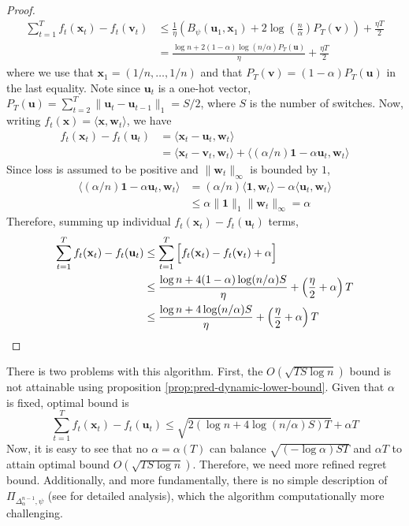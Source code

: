 \documentclass[12pt, a4paper]{report}
\begin{document}
\begin{proof}
\begin{align}
    \sum_{t=1}^T f_t(\mathbf{x}_t) - f_t(\mathbf{v}_t) &\leq  \frac{1}{\eta} \left(B_\psi(\mathbf{u}_1, \mathbf{x}_1) + 2\log\left(\frac{n}{\alpha}\right)P_T(\mathbf{v}) \right) + \frac{\eta T}{2} \nonumber
    \\
    &= \frac{\log n + 2(1-\alpha)\log(n / \alpha) P_T(\mathbf{u})}{\eta} + \frac{\eta T}{2} \nonumber
\end{align}
where we use that $\mathbf{x}_1 = (1/n, \dots, 1/n)$ and that $P_T(\mathbf{v}) = (1 - \alpha)P_T(\mathbf{u})$ in the last equality. Note since $\mathbf{u}_t$ is a one-hot vector, $P_T(\mathbf{u}) = \sum_{t=2}^T \lVert \mathbf{u}_t - \mathbf{u}_{t-1} \rVert_1 = S/2$, where $S$ is the number of switches. Now, writing $f_t(\mathbf{x}) = \langle \mathbf{x}, \mathbf{w}_t \rangle$, we have
\begin{align*}
    f_t(\mathbf{x}_t) - f_t(\mathbf{u}_t) &= \langle \mathbf{x}_t - \mathbf{u}_t, \mathbf{w}_t \rangle
    \\
    &= \langle \mathbf{x}_t - \mathbf{v}_t, \mathbf{w}_t \rangle + \langle (\alpha/n) \mathbf{1} - \alpha \mathbf{u}_t, \mathbf{w}_t \rangle
\end{align*}
Since loss is assumed to be positive and $\lVert \mathbf{w}_t \rVert_\infty$ is bounded by $1$,
\begin{align*}
    \langle (\alpha/n)\mathbf{1} - \alpha \mathbf{u}_t, \mathbf{w}_t \rangle &= (\alpha/n) \langle \mathbf{1}, \mathbf{w}_t \rangle - \alpha \langle \mathbf{u}_t, \mathbf{w}_t \rangle 
    \\
    &\leq \alpha \lVert \mathbf{1} \rVert_1 \lVert \mathbf{w}_t \rVert_\infty = \alpha
\end{align*}
Therefore, summing up individual $f_t(\mathbf{x}_t) - f_t(\mathbf{u}_t)$ terms,
\begin{align*}
    \sum_{t=1}^T f_t(\mathbf{x}_t) - f_t(\mathbf{u}_t) &\leq \sum_{t=1}^T \Big[ f_t(\mathbf{x}_t) - f_t(\mathbf{v}_t) + \alpha \Big]
    \\ 
    &\leq \frac{\log n + 4(1 - \alpha) \log(n/\alpha) S}{\eta} + \left(\frac{\eta}{2} + \alpha\right)T 
    \\
    &\leq \frac{\log n + 4\log(n/\alpha) S}{\eta} + \left(\frac{\eta}{2} + \alpha\right)T\qedhere
\end{align*}
\end{proof}
There is two problems with this algorithm. First, the $O(\sqrt{TS\log n})$ bound is not attainable using proposition \ref{prop:pred-dynamic-lower-bound}. Given that $\alpha$ is fixed, optimal bound is 
\begin{equation*}
    \sum_{t=1}^T f_t(\mathbf{x}_t) - f_t(\mathbf{u}_t) \leq \sqrt{2(\log n + 4 \log(n/\alpha)S)T} + \alpha T
\end{equation*}
Now, it is easy to see that no $\alpha = \alpha(T)$ can balance $\sqrt{(-\log \alpha)ST}$ and $\alpha T$ to attain optimal bound $O(\sqrt{TS \log n})$. Therefore, we need more refined regret bound. Additionally, and more fundamentally, there is no simple description of $\Pi_{\Delta_\alpha^{n-1}, \psi}$ (see \cite[Theorem 7]{Herbster2001Tracking} for detailed analysis), which the algorithm computationally more challenging. 
\end{document}
